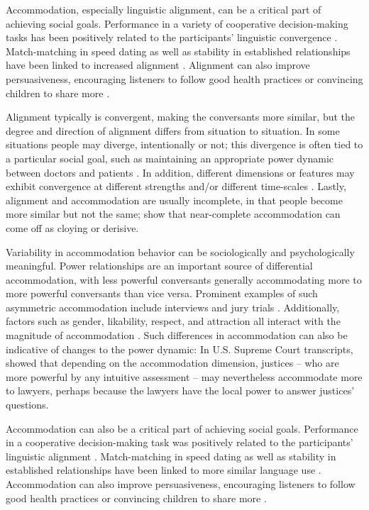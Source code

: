 \documentclass{acm_proc_article-sp}
\begin{document}
Accommodation, especially linguistic alignment, can be a critical part of achieving social goals.  Performance in a variety of cooperative decision-making tasks has been positively related to the participants' linguistic convergence \cite{FusaroliEtAl2012,KacewiczEtAl2013}.  Match-matching in speed dating as well as stability in established relationships have been linked to increased alignment \cite{IrelandEtAl2011}.  Alignment can also improve persuasiveness, encouraging listeners to follow good health practices \cite{KlineCeropski1984} or convincing children to share more \cite{BurlesonFennelly1981}.

Alignment typically is convergent, making the conversants more similar, but the degree and direction of alignment differs from situation to situation. In some situations people may diverge, intentionally or not; this divergence is often tied to a particular social goal, such as maintaining an appropriate power dynamic between doctors and patients \cite{Ferrara1991}. In addition, different dimensions or features may exhibit convergence at different strengths \cite{ThakerarGilesCheshire1982,BilousKrauss1988,DNMGamonDumais2011} and/or different time-scales \cite{Ferrara1991}.  Lastly, alignment and accommodation are usually incomplete, in that people become more similar but not the same; \cite{GilesCouplandCoupland1991,GilesSmith1979} show that near-complete accommodation can come off as cloying or derisive.

Variability in accommodation behavior can be sociologically and psychologically meaningful.  Power relationships are an important source of differential accommodation, with less powerful conversants generally accommodating more to more powerful conversants than vice versa. Prominent examples of such asymmetric accommodation include interviews and jury trials \cite{WillemynsEtAl1997,Gnisci2005,DNMEtAl2012}.  Additionally, factors such as gender, likability, respect, and attraction all interact with the magnitude of accommodation \cite{BilousKrauss1988,Natale1975}. Such differences in accommodation can also be indicative of changes to the power dynamic: In U.S. Supreme Court transcripts, \cite{guo2015} showed that depending on the accommodation dimension, justices -- who are more powerful by any intuitive assessment -- may nevertheless accommodate more to lawyers, perhaps because the lawyers have the local power to answer justices' questions.

Accommodation can also be a critical part of achieving social goals.  Performance in a cooperative decision-making task was positively related to the participants' linguistic alignment \cite{FusaroliEtAl2012}.  Match-matching in speed dating as well as stability in established relationships have been linked to more similar language use \cite{IrelandEtAl2011}.  Accommodation can also improve persuasiveness, encouraging listeners to follow good health practices \cite{KlineCeropski1984} or convincing children to share more \cite{BurlesonFennelly1981}.
\end{document}

